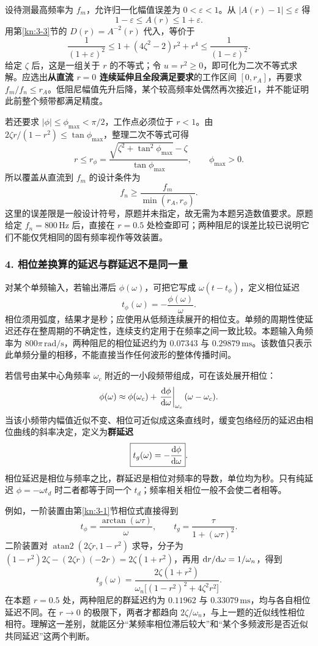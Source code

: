 设待测最高频率为 $f_m$，允许归一化幅值误差为 $0<\varepsilon<1$。从 $|A(r)-1|\leq\varepsilon$ 得
\[
1-\varepsilon\leq A(r)\leq1+\varepsilon.
\]
用第\ref{kn:3-3}节的 $D(r)=A^{-2}(r)$ 代入，等价于
\[
\boxed{\frac{1}{(1+\varepsilon)^2}
\leq1+(4\zeta^2-2)r^2+r^4
\leq\frac{1}{(1-\varepsilon)^2}}.
\]
给定 $\zeta$ 后，这是一组关于 $r$ 的不等式；令 $u=r^2\geq0$，即可化为二次不等式求解。应选出\textbf{从直流 $r=0$ 连续延伸且全段满足要求}的工作区间 $[0,r_A]$，再要求 $f_m/f_n\leq r_A$。低阻尼幅值先升后降，某个较高频率处偶然再次接近1，并不能证明此前整个频带都满足精度。

若还要求 $|\phi|\leq\phi_{\max}<\pi/2$，工作点必须位于 $r<1$。由
$2\zeta r/(1-r^2)\leq\tan\phi_{\max}$，整理二次不等式可得
\[
r\leq r_\phi
=\frac{\sqrt{\zeta^2+\tan^2\phi_{\max}}-\zeta}
{\tan\phi_{\max}},\qquad \phi_{\max}>0.
\]
所以覆盖从直流到 $f_m$ 的设计条件为
\[
\boxed{f_n\geq\frac{f_m}{\min(r_A,r_\phi)}}.
\]
这里的误差限是一般设计符号，原题并未指定，故无需为本题另造数值要求。原题给定 $f_n=800\,\mathrm{Hz}$ 后，直接在 $r=0.5$ 处检查即可；两种阻尼的误差比较已说明它们不能仅凭相同的固有频率视作等效装置。

\subsubsection*{4. 相位差换算的延迟与群延迟不是同一量}
对某个单频输入，若输出滞后 $\phi(\omega)$，可把它写成 $\omega(t-t_\phi)$，定义相位延迟
\[
\boxed{t_\phi(\omega)=-\frac{\phi(\omega)}{\omega}}.
\]
相位须用弧度，结果才是秒；应使用从低频连续展开的相位支。单频的周期性使延迟还存在整周期的不确定性，连续支约定用于在频率之间一致比较。本题输入角频率为 $800\pi\,\mathrm{rad/s}$，两种阻尼的相位延迟约为 $0.07343$ 与 $0.29879\,\mathrm{ms}$。该数值只表示此单频分量的相移，不能直接当作任何波形的整体传播时间。

若信号由某中心角频率 $\omega_c$ 附近的一小段频带组成，可在该处展开相位：
\[
\phi(\omega)\approx\phi(\omega_c)
+\left.\frac{\mathrm{d}\phi}{\mathrm{d}\omega}\right|_{\omega_c}(\omega-\omega_c).
\]
当该小频带内幅值近似不变、相位可近似成这条直线时，缓变包络经历的延迟由相位曲线的斜率决定，定义为\textbf{群延迟}
\[
\boxed{t_g(\omega)=-\frac{\mathrm{d}\phi}{\mathrm{d}\omega}}.
\]
相位延迟是相位与频率之比，群延迟是相位对频率的导数，单位均为秒。只有纯延迟 $\phi=-\omega t_d$ 时二者都等于同一个 $t_d$；频率相关相位一般不会使二者相等。

例如，一阶装置由第\ref{kn:3-1}节相位式直接得到
\[
t_\phi=\frac{\arctan(\omega\tau)}{\omega},\qquad
t_g=\frac{\tau}{1+(\omega\tau)^2}.
\]
二阶装置对 $\operatorname{atan2}(2\zeta r,1-r^2)$ 求导，分子为
$(1-r^2)2\zeta-(2\zeta r)(-2r)=2\zeta(1+r^2)$，再用 $\mathrm{d} r/\mathrm{d}\omega=1/\omega_n$，得到
\[
t_g(\omega)=\frac{2\zeta(1+r^2)}
{\omega_n\bigl[(1-r^2)^2+4\zeta^2r^2\bigr]}.
\]
在本题 $r=0.5$ 处，两种阻尼的群延迟约为 $0.11962$ 与 $0.33079\,\mathrm{ms}$，均与各自相位延迟不同。在 $r\to0$ 的极限下，两者才都趋向 $2\zeta/\omega_n$，与上一题的近似线性相位相符。理解这一差别，就能区分“某频率相位滞后较大”和“某个多频波形是否近似共同延迟”这两个判断。
